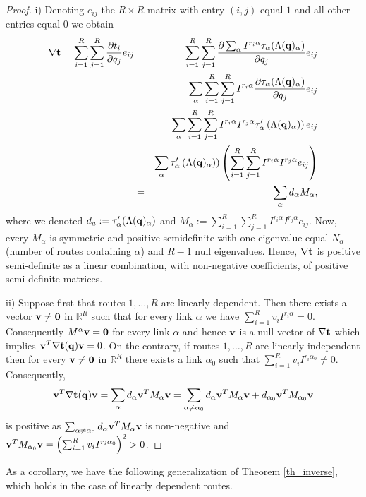 \documentclass[a4paper,11pt]{article}
\begin{document}
\begin{proof}
i) Denoting $e_{ij}$ the $R \times R$ matrix with entry $(i,j)$ equal $1$ and all other entries equal $0$ we obtain
\begin{eqnarray*}
\nabla \bold{t} = \sum_{i=1}^R \sum_{j=1}^R  \frac {\partial t_i} {\partial q_j} e_{ij} &=& \sum_{i=1}^R \sum_{j=1}^R  \frac {\partial \sum_{\alpha} I^{r_i \alpha} \tau_\alpha(\Lambda(\bold{q})_\alpha)} {\partial q_j} e_{ij} \\ &=& \sum_{\alpha} \sum_{i=1}^R \sum_{j=1}^R I^{r_i \alpha} \frac {\partial  \tau_\alpha(\Lambda(\bold{q})_\alpha)} {\partial q_j} e_{ij} \\
&=& \sum_{\alpha} \sum_{i=1}^R \sum_{j=1}^R I^{r_i \alpha}I^{r_j \alpha} \tau_\alpha'\left(\Lambda(\bold{q})_\alpha)\right) e_{ij} \\
&=& \sum_{\alpha}\tau_\alpha'\left(\Lambda(\bold{q})_\alpha)\right) \left(\sum_{i=1}^R \sum_{j=1}^R I^{r_i \alpha}I^{r_j \alpha} e_{ij}\right) \\
&=& \sum_\alpha d_\alpha M_\alpha, 
\end{eqnarray*}
where we denoted $d_a := \tau_{\alpha}'(\Lambda(\bold{q})_\alpha)$ and $M_\alpha:= \sum_{i=1}^R \sum_{j=1}^R I^{r_i \alpha}I^{r_j \alpha} e_{ij}$.
Now, every $M_\alpha$ is symmetric and positive semidefinite with one eigenvalue equal $N_\alpha$ (number of routes containing $\alpha$) and $R-1$ null eigenvalues. Hence, $\nabla \bold{t}$ is positive semi-definite as a linear combination, with non-negative coefficients, of positive semi-definite matrices.

ii) Suppose first that routes $1, \dots, R$ are linearly dependent. Then there exists a vector $\bold{v} \neq \bold{0}$ in $\mathbb{R}^R$ such that   for every link $\alpha$ we have $\sum_{i=1}^R v_i I^{r_i \alpha} = 0$. Consequently $M^\alpha \bold{v} = \bold{0}$ for every link $\alpha$ and hence $\bold{v}$ is a null vector of $\bold{\nabla t}$ which implies $\bold{v}^T \bold{\nabla t}(\bold{q}) \bold{v} = 0$. 
On the contrary, if routes $1, \dots, R$ are linearly independent then for every $\bold{v} \neq \bold{0}$ in $\mathbb{R}^R$ there exists a link $\alpha_0$ such that $\sum_{i=1}^R v_i I^{r_i \alpha_0} \neq 0$. Consequently,  
\begin{eqnarray*}
\bold{v}^T \bold{\nabla t}(\bold{q}) \bold{v} =  \sum_\alpha d_\alpha \bold{v}^T M_\alpha \bold{v} = \sum_{\alpha \neq \alpha_0} d_\alpha \bold{v}^T M_\alpha \bold{v} + d_{\alpha_0} \bold{v}^T M_{\alpha_0} \bold{v}
\end{eqnarray*}
is positive as $\sum_{\alpha \neq \alpha_0} d_\alpha \bold{v}^T M_\alpha \bold{v}$ is non-negative and $\bold{v}^T M_{\alpha_0} \bold{v} = \left(\sum_{i=1}^R v_i I^{r_i\alpha_0}\right)^2 > 0$.

\end{proof}
As a corollary, we have the following generalization of Theorem \ref{th_inverse}, which holds in the case of linearly dependent routes. 
\end{document}
